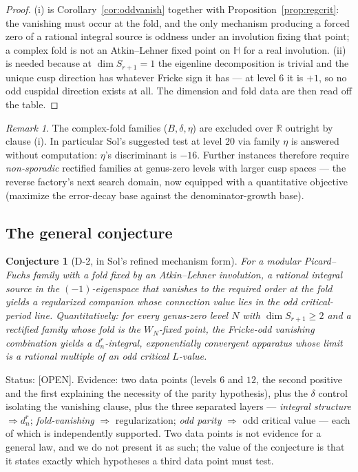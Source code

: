 \documentclass[11pt,reqno]{amsart}
\theoremstyle{plain}
\newtheorem{conjecture}[theorem]{Conjecture}
\theoremstyle{definition}
\theoremstyle{remark}
\newtheorem{remark}[theorem]{Remark}
\newcommand{\R}{\mathbb{R}}
\newcommand{\HH}{\mathbb{H}}
\newcommand{\Open}{\textup{\textsf{[OPEN]}}}
\begin{document}
\begin{proof}
(i) is Corollary~\ref{cor:oddvanish} together with
Proposition~\ref{prop:regcrit}: the vanishing must occur at the fold, and
the only mechanism producing a forced zero of a rational integral source is
oddness under an involution fixing that point; a complex fold is not an
Atkin--Lehner fixed point on $\HH$ for a real involution. (ii) is needed
because at $\dim S_{r+1}=1$ the eigenline decomposition is trivial and the
unique cusp direction has whatever Fricke sign it has --- at level $6$ it
is $+1$, so no odd cuspidal direction exists at all. The dimension and
fold data are then read off the table.
\end{proof}

\begin{remark}
The complex-fold families ($B,\delta,\eta$) are excluded over $\R$
outright by clause (i). In particular Sol's suggested test at level $20$
via family $\eta$ is answered without computation: $\eta$'s discriminant is
$-16$. Further instances therefore require \emph{non-sporadic} rectified
families at genus-zero levels with larger cusp spaces --- the reverse
factory's next search domain, now equipped with a quantitative objective
(maximize the error-decay base against the denominator-growth base).
\end{remark}

\subsection{The general conjecture}
\begin{conjecture}[D-2, in Sol's refined mechanism form]\label{conj:d2}
For a modular Picard--Fuchs family with a fold fixed by an Atkin--Lehner
involution, a rational integral source in the $(-1)$-eigenspace that
vanishes to the required order at the fold yields a regularized companion
whose connection value lies in the odd critical-period line. Quantitatively:
for every genus-zero level $N$ with $\dim S_{r+1}\ge2$ and a rectified
family whose fold is the $W_N$-fixed point, the Fricke-odd vanishing
combination yields a $d_n^r$-integral, exponentially convergent apparatus
whose limit is a rational multiple of an odd critical $L$-value.
\end{conjecture}

Status: \Open. Evidence: two data points (levels $6$ and $12$, the second
positive and the first explaining the necessity of the parity hypothesis),
plus the $\delta$ control isolating the vanishing clause, plus the three
separated layers --- \emph{integral structure} $\Rightarrow d_n^r$;
\emph{fold-vanishing} $\Rightarrow$ regularization; \emph{odd parity}
$\Rightarrow$ odd critical value --- each of which is independently
supported. Two data points is not evidence for a general law, and we do
not present it as such; the value of the conjecture is that it states
exactly which hypotheses a third data point must test.
\end{document}
